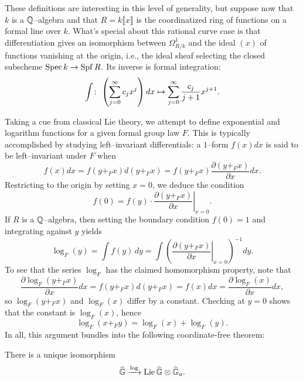 These definitions are interesting in this level of generality, but suppose now that $k$ is a $\mathbb{Q}$--algebra and that $R = k\llbracket x \rrbracket$ is the coordinatized ring of functions on a formal line over $k$.  What's special about this rational curve case is that differentiation gives an isomorphism between $\Omega^1_{R/k}$ and the ideal $(x)$ of functions vanishing at the origin, i.e., the ideal sheaf selecting the closed subscheme $\operatorname{Spec} k \to \operatorname{Spf} R$.  Its inverse is formal integration: \[\int \colon\thinspace \left(\sum_{j=0}^\infty c_j x^j \right) dx \mapsto \sum_{j=0}^\infty \frac{c_j}{j+1} x^{j+1}.\]

Taking a cue from classical Lie theory, we attempt to define exponential and logarithm functions for a given formal group law $F$.  This is typically accomplished by studying left--invariant differentials: a $1$--form $f(x) dx$ is said to be left--invariant under $F$ when \[f(x) dx = f(y +_F x) d(y +_F x) = f(y +_F x) \frac{\partial(y +_F x)}{\partial x} dx.\]  Restricting to the origin by setting $x = 0$, we deduce the condition \[f(0) = f(y) \cdot \left. \frac{\partial(y +_F x)}{\partial x} \right|_{x=0}.\]  If $R$ is a $\mathbb{Q}$--algebra, then setting the boundary condition $f(0) = 1$ and integrating against $y$ yields \[\log_F(y) = \int f(y) \, dy = \int \left( \left. \frac{\partial(y +_F x)}{\partial x} \right|_{x=0} \right)^{-1} dy.\]  To see that the series $\log_F$ has the claimed homomorphism property, note that \[\frac{\partial \log_F(y +_F x)}{\partial x} dx = f(y +_F x) d(y +_F x) = f(x) dx = \frac{\partial \log_F(x)}{\partial x} dx,\] so $\log_F(y +_F x)$ and $\log_F(x)$ differ by a constant.  Checking at $y = 0$ shows that the constant is $\log_F(x)$, hence \[\log_F(x +_F y) = \log_F(x) + \log_F(y).\]  In all, this argument bundles into the following coordinate-free theorem:
\begin{theorem}\label{RationalFGLsHaveLogarithms}
There is a unique isomorphism \[\G \xrightarrow{\log} \operatorname{Lie} \G \otimes \G_a. \qed\] 
\end{theorem}








